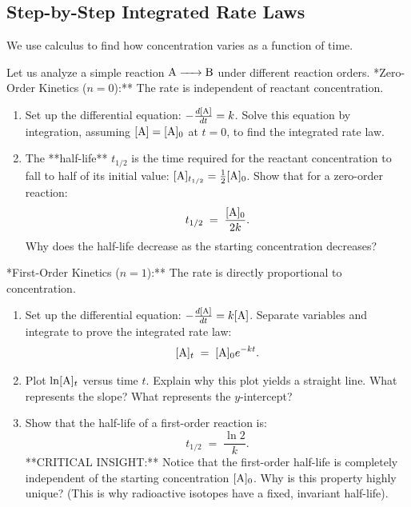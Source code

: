 \documentclass[12pt, a4paper]{book}
\begin{document}
\subsection{Step-by-Step Integrated Rate Laws}

We use calculus to find how concentration varies as a function of time.

\begin{explobox}
Let us analyze a simple reaction $\ce{A -> B}$ under different reaction orders.
\problem **Zero-Order Kinetics ($n=0$):** The rate is independent of reactant concentration.
\begin{enumerate}[label=(\alph*), leftmargin=*]
  \item Set up the differential equation: $-\frac{d[\ce{A}]}{dt} = k$. Solve this equation by integration, assuming $[\ce{A}] = [\ce{A}]_0$ at $t = 0$, to find the integrated rate law.
  \item The **half-life** $t_{1/2}$ is the time required for the reactant concentration to fall to half of its initial value: $[\ce{A}]_{t_{1/2}} = \frac{1}{2}[\ce{A}]_0$. Show that for a zero-order reaction:
  \[
    t_{1/2} \;=\; \frac{[\ce{A}]_0}{2k}.
  \]
  Why does the half-life decrease as the starting concentration decreases?
\end{enumerate}

\problem **First-Order Kinetics ($n=1$):** The rate is directly proportional to concentration.
\begin{enumerate}[label=(\alph*), leftmargin=*]
  \item Set up the differential equation: $-\frac{d[\ce{A}]}{dt} = k[\ce{A}]$. Separate variables and integrate to prove the integrated rate law:
  \[
    [\ce{A}]_t \;=\; [\ce{A}]_0 e^{-kt}.
  \]
  \item Plot $\ln[\ce{A}]_t$ versus time $t$. Explain why this plot yields a straight line. What represents the slope? What represents the $y$-intercept?
  \item Show that the half-life of a first-order reaction is:
  \[
    t_{1/2} \;=\; \frac{\ln 2}{k}.
  \]
  **CRITICAL INSIGHT:** Notice that the first-order half-life is completely independent of the starting concentration $[\ce{A}]_0$. Why is this property highly unique? (This is why radioactive isotopes have a fixed, invariant half-life).
\end{enumerate}


\end{explobox}
\end{document}
